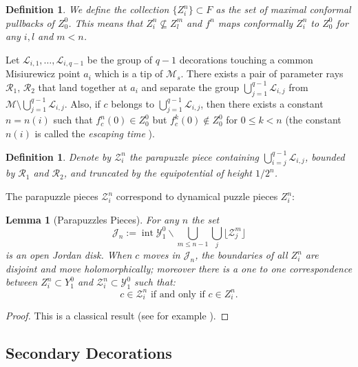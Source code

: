 \documentclass[12pt,a4paper]{amsart}
\newtheorem{lemma}[theorem]{Lemma}
\newtheorem{definition}[theorem]{Definition}
\newcommand{\JJ}{\mathcal J}
\newcommand{\LL}{\mathcal L}
\newcommand{\MM}{\mathcal M}
\newcommand{\RR}{\mathcal R}
\newcommand{\YY}{\mathcal Y}
\newcommand{\ZZ}{\mathcal Z}
\newcommand{\intr}{\operatorname{int}}
\begin{document}
\begin{definition}
\label{def1} We define the collection $\{Z^{n}_{i}\}\subset F$ as
the set of maximal conformal pullbacks of $Z^0_0$. This means that
$Z^{n}_{i}\not\subseteq Z^{m}_{l}$ and $f^{n}$ maps conformally
$Z^{n}_{i}$ to $Z^0_0$ for any $i,l$ and $m<n$.
\end{definition}


  Let $\LL_{i,1},\ldots, \LL_{i,q-1}$ be the
group of $q-1$ decorations touching a common Misiurewicz point $a_i$
which is a tip of $\MM_s$. There exists a pair of parameter rays
$\RR_1$, $\RR_2$ that land together at $a_i$ and separate the group
$\bigcup_{j=1}^{q-1} \LL_{i,j}$ from $\MM\setminus
\bigcup_{j=1}^{q-1} \LL_{i,j}$. Also, if $c$ belongs to
$\bigcup_{j=1}^{q-1} \LL_{i,j}$, then there
  exists a constant $n=n(i)$ such that $f_{c}^{n}(0)\in
  Z^{0}_{0}$ but $f_{c}^{k}(0)\not\in
  Z^{0}_{0}$ for $0\le k<n$ (the constant $n(i)$ is called the
\emph{escaping time} \cite{L1}).


\begin{definition}
\label{def2} Denote by $\ZZ^{n}_{i}$ the parapuzzle piece containing
$\bigcup_{i=j}^{q-1} \LL_{i,j}$,
  bounded by $\RR_1$ and $\RR_2$, and truncated by
  the equipotential of height $1/2^n$.
\end{definition}



The parapuzzle pieces $\ZZ^{n}_{i}$ correspond to dynamical puzzle
pieces $Z^{n}_{i}$:


\begin{lemma}[Parapuzzles Pieces]
\label{lem1}  For any $n$ the set
\[
\JJ_n:=\intr\YY^{0}_{1}\backslash \bigcup_{m\le n-1}\bigcup_j
\lfloor\ZZ^{m}_{j}\rfloor
\]
is an open Jordan disk. When $c$ moves in $\JJ_n$, the boundaries of
all $Z^{n}_{i}$
  are disjoint and move holomorphically; moreover
there is a one to one correspondence between $Z^{n}_{i}\subset
Y^{0}_{1}$ and $\ZZ^{n}_{i}\subset\YY^{0}_{1}$ such that:
$$c\in \ZZ^{n}_{i} \text{ if and only if } c\in
Z^{n}_{i}.$$
\end{lemma}

\begin{proof}
This is a classical result (see for example \cite[Lemma $3.3$,
10]{ALS}).
\end{proof}




\subsection{Secondary Decorations}
\end{document}
